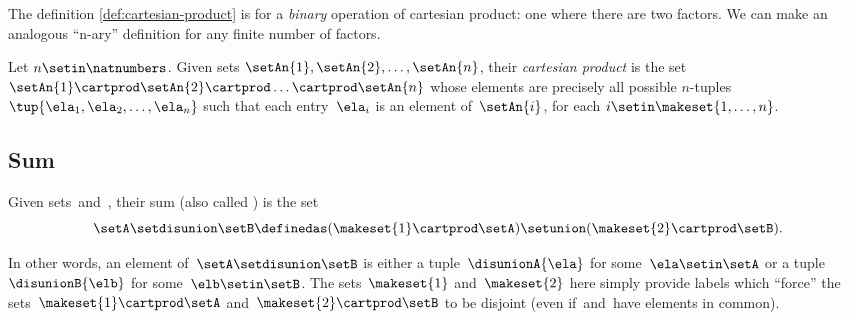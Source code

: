 The definition \cref{def:cartesian-product} is for a \emph{binary} operation of cartesian product: one where there are two factors.
We can make an analogous ``n-ary'' definition for any finite number of factors.

\begin{ctdefinition}
    \label{def:n-ary-cartesian-product}
    Let $n \setin \natnumbers$.
    Given sets $\setAn{1}, \setAn{2}, \dots, \setAn{n}$, their \emph{cartesian product} is the set $\setAn{1} \cartprod \setAn{2} \cartprod \dots \cartprod \setAn{n}$ whose elements are precisely all possible $n$-tuples~$\tup{\ela_{1}, \ela_{2}, \dots, \ela_{n}}$ such that each entry~$\ela_{i}$ is an element of~$\setAn{i}$, for each $i \setin \makeset{1, \dots, n}$.
\end{ctdefinition}

\subsection{Sum}
\label{sec:disjoint-union}

\begin{ctdefinition}
    \label{def:disjoint-union-of-sets}
    Given sets~\setA and~\setB, their sum (also called ) is the set
    \begin{equation}
        \setA \setdisunion \setB \definedas ( \makeset{ 1 } \cartprod \setA) \setunion ( \makeset{2} \cartprod \setB).
    \end{equation}
\end{ctdefinition}
In other words, an element of~$\setA \setdisunion \setB$ is either a tuple~$\disunionA{\ela}$ for some~$\ela \setin\setA$ or a tuple $\disunionB{\elb}$ for some~$\elb \setin\setB$.
The sets~$\makeset{ 1 }$ and~$\makeset{2}$ here simply provide labels which ``force'' the sets~$\makeset{ 1 } \cartprod \setA$ and~$ \makeset{2} \cartprod \setB$ to be disjoint (even if~\setA and~\setB have elements in common).



